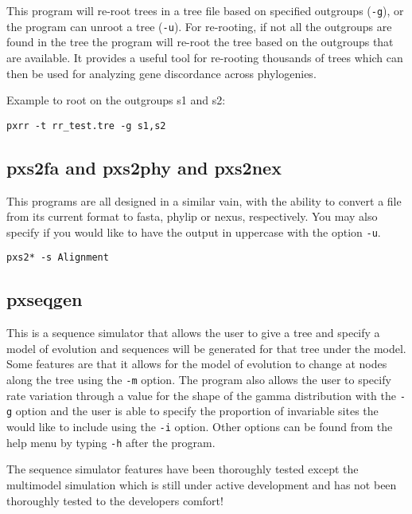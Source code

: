 \documentclass[12pt,letterpaper]{memoir}
\begin{document}
This program will re-root trees in a tree file based on specified outgroups (\texttt{-g}), or the program can unroot a tree (\texttt{-u}). For re-rooting, if not all the outgroups are found in the tree the program will re-root the tree based on the outgroups that are available. It provides a useful tool for re-rooting thousands of trees which can then be used for analyzing gene discordance across phylogenies.

\begin{flushleft}
Example to root on the outgroups s1 and s2:
\begin{verbatim}
pxrr -t rr_test.tre -g s1,s2
\end{verbatim}
\end{flushleft}

\subsection{pxs2fa and pxs2phy and  pxs2nex}

This programs are all designed in a similar vain, with the ability to convert a file from its current format to fasta, phylip or nexus, respectively. You may also specify if you would like to have the output in uppercase with the option \texttt{-u}.


\begin{flushleft}
\begin{verbatim}
pxs2* -s Alignment
\end{verbatim}
\end{flushleft}

\subsection{pxseqgen}

This is a sequence simulator that allows the user to give a tree and specify a model of evolution and sequences will be generated for that tree under the model. Some features are that it allows for the model of evolution to change at nodes along the tree using the \texttt{-m} option. The program also allows the user to specify rate variation through a value for the shape of the gamma distribution with the \texttt{-g} option and the user is able to specify the proportion of invariable sites the would like to include using the \texttt{-i} option. Other options can be found from the help menu by typing \texttt{-h} after the program.

The sequence simulator features have been thoroughly tested except the multimodel simulation which is still under active development and has not been thoroughly tested to the developers comfort!
\end{document}
